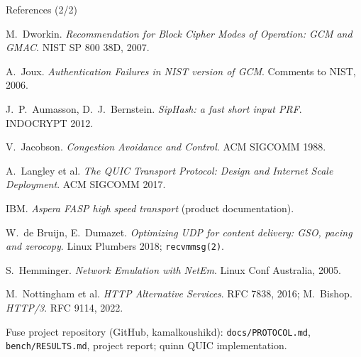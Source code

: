 \documentclass[aspectratio=169,11pt]{beamer}
\begin{document}
\begin{frame}{References (2/2)}
  \scriptsize
  \begin{enumerate}[{[}1{]}]\setcounter{enumi}{10}\setlength{\itemsep}{1pt}
    \item M.~Dworkin. \emph{Recommendation for Block Cipher Modes of Operation: GCM and GMAC}. NIST SP 800 38D, 2007.
    \item A.~Joux. \emph{Authentication Failures in NIST version of GCM}. Comments to NIST, 2006.
    \item J.~P.~Aumasson, D.~J.~Bernstein. \emph{SipHash: a fast short input PRF}. INDOCRYPT 2012.
    \item V.~Jacobson. \emph{Congestion Avoidance and Control}. ACM SIGCOMM 1988.
    \item A.~Langley et al. \emph{The QUIC Transport Protocol: Design and Internet Scale Deployment}. ACM SIGCOMM 2017.
    \item IBM. \emph{Aspera FASP high speed transport} (product documentation).
    \item W.~de Bruijn, E.~Dumazet. \emph{Optimizing UDP for content delivery: GSO, pacing and zerocopy}. Linux Plumbers 2018; \texttt{recvmmsg(2)}.
    \item S.~Hemminger. \emph{Network Emulation with NetEm}. Linux Conf Australia, 2005.
    \item M.~Nottingham et al. \emph{HTTP Alternative Services}. RFC 7838, 2016; M.~Bishop. \emph{HTTP/3}. RFC 9114, 2022.
    \item Fuse project repository (GitHub, kamalkoushikd): \texttt{docs/PROTOCOL.md}, \texttt{bench/RESULTS.md}, project report; quinn QUIC implementation.
  \end{enumerate}
\end{frame}
\end{document}
